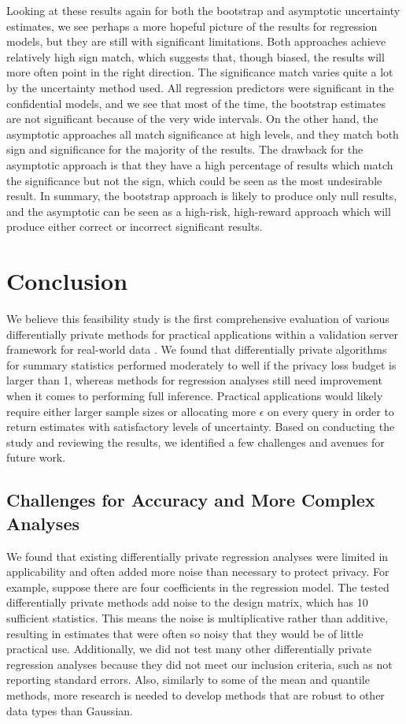 Looking at these results again for both the bootstrap and asymptotic uncertainty estimates, we see perhaps a more hopeful picture of the results for regression models, but they are still with significant limitations. Both approaches achieve relatively high sign match, which suggests that, though biased, the results will more often point in the right direction. The significance match varies quite a lot by the uncertainty method used. All regression predictors were significant in the confidential models, and we see that most of the time, the bootstrap estimates are not significant because of the very wide intervals. On the other hand, the asymptotic approaches all match significance at high levels, and they match both sign and significance for the majority of the results. The drawback for the asymptotic approach is that they have a high percentage of results which match the significance but not the sign, which could be seen as the most undesirable result. In summary, the bootstrap approach is likely to produce only null results, and the asymptotic can be seen as a high-risk, high-reward approach which will produce either correct or incorrect significant results.

\section{Conclusion}\label{sec:conclusion}
We believe this feasibility study is the first comprehensive evaluation of various differentially private methods for practical applications within a validation server framework for real-world data \citep{barrientos2021}. We found that differentially private algorithms for summary statistics performed moderately to well if the privacy loss budget is larger than 1, whereas methods for regression analyses still need improvement when it comes to performing full inference. Practical applications would likely require either larger sample sizes or allocating more $\epsilon$ on every query in order to return estimates with satisfactory levels of uncertainty. Based on conducting the study and reviewing the results, we identified a few challenges and avenues for future work.

\subsection{Challenges for Accuracy and More Complex Analyses}
We found that existing differentially private regression analyses were limited in applicability and often added more noise than necessary to protect privacy. For example, suppose there are four coefficients in the regression model. The tested differentially private methods add noise to the design matrix, which has 10 sufficient statistics. This means the noise is multiplicative rather than additive, resulting in estimates that were often so noisy that they would be of little practical use. Additionally, we did not test many other differentially private regression analyses because they did not meet our inclusion criteria, such as not reporting standard errors. Also, similarly to some of the mean and quantile methods, more research is needed to develop methods that are robust to other data types than Gaussian.

